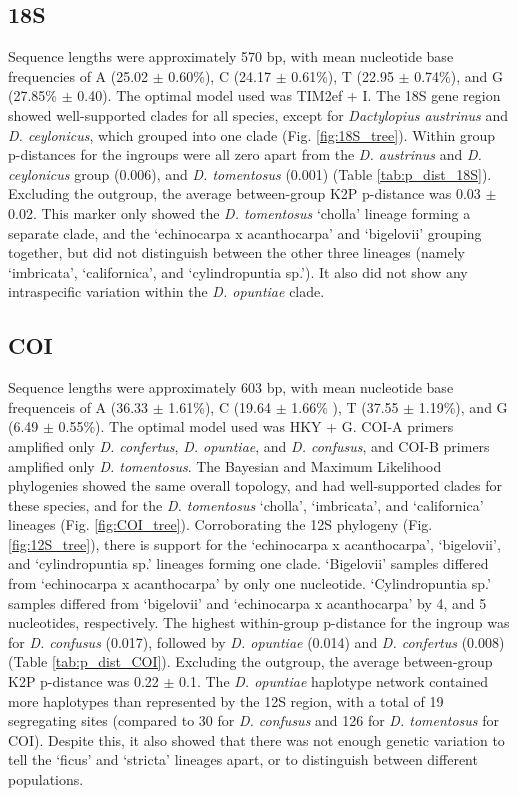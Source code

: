 \subsection{18S}

Sequence lengths were approximately 570 bp, with mean nucleotide base frequencies of A (25.02 $\pm$ 0.60\%), C (24.17 $\pm$ 0.61\%), T (22.95 $\pm$ 0.74\%), and G (27.85\% $\pm$ 0.40). The optimal model used was TIM2ef + I.
The 18S gene region showed well-supported clades for all species, except for \textit{Dactylopius austrinus} and \textit{D. ceylonicus}, which grouped into one clade (Fig. \ref{fig:18S_tree}).
Within group p-distances for the ingroups were all zero apart from the \textit{D. austrinus} and \textit{D. ceylonicus} group (0.006), and \textit{D. tomentosus} (0.001) (Table \ref{tab:p_dist_18S}). Excluding the outgroup, the average between-group K2P p-distance was 0.03 $\pm$ 0.02. 
This marker only showed the \textit{D. tomentosus} `cholla' lineage forming a separate clade, and the `echinocarpa x acanthocarpa' and `bigelovii' grouping together, but did not distinguish between the other three lineages (namely `imbricata', `californica', and `cylindropuntia sp.'). It also did not show any intraspecific variation within the \textit{D. opuntiae} clade.

\subsection{COI}
Sequence lengths were approximately 603 bp, with mean nucleotide base frequenceis of A (36.33 $\pm$ 1.61\%), C (19.64 $\pm$ 1.66\% ), T (37.55 $\pm$ 1.19\%), and G (6.49 $\pm$ 0.55\%). The optimal model used was HKY + G.
COI-A primers amplified only \textit{D. confertus}, \textit{D. opuntiae}, and \textit{D. confusus}, and COI-B primers amplified only \textit{D. tomentosus}. The Bayesian and Maximum Likelihood phylogenies showed the same overall topology, and had well-supported clades for these species, and for the \textit{D. tomentosus} `cholla', `imbricata', and `californica' lineages (Fig. \ref{fig:COI_tree}). Corroborating the 12S phylogeny (Fig. \ref{fig:12S_tree}), there is support for the `echinocarpa x acanthocarpa', `bigelovii', and `cylindropuntia sp.' lineages forming one clade. `Bigelovii' samples differed from `echinocarpa x acanthocarpa' by only one nucleotide. `Cylindropuntia sp.' samples differed from `bigelovii' and `echinocarpa x acanthocarpa' by 4, and 5 nucleotides, respectively.
The highest within-group p-distance for the ingroup was for \textit{D. confusus} (0.017), followed by \textit{D. opuntiae} (0.014) and \textit{D. confertus} (0.008) (Table \ref{tab:p_dist_COI}). Excluding the outgroup, the average between-group K2P p-distance was 0.22 $\pm$ 0.1.
The \textit{D. opuntiae} haplotype network contained more haplotypes than represented by the 12S region, with a total of 19 segregating sites (compared to 30 for \textit{D. confusus} and 126 for \textit{D. tomentosus} for COI). Despite this, it also showed that there was not enough genetic variation to tell the `ficus' and `stricta' lineages apart, or to distinguish between different populations.

